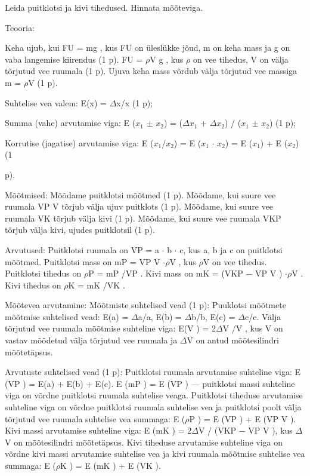 
Leida puitklotsi ja kivi tihedused. Hinnata mõõteviga.

\hint

\solu
Teooria:

Keha ujub, kui FU = mg , kus FU on üleslükke jõud, m on keha mass ja g on vaba langemise kiirendus (1 p). FU = $\rho$V g , kus $\rho$ on vee tihedus, V on välja tõrjutud vee ruumala (1 p). Ujuva keha mass võrdub välja tõrjutud vee massiga m = $\rho$V (1 p).

Suhtelise vea valem: E(x) = $\Delta$x/x (1 p);

Summa (vahe) arvutamise viga: E ($x_1$ $\pm$ $x_2$) = ($\Delta$$x_1$ + $\Delta$$x_2$) / ($x_1$ $\pm$ $x_2$) (1 p);

Korrutise (jagatise) arvutamise viga: E ($x_1$/$x_2$) = E ($x_1$ $\cdot$ $x_2$) = E ($x_1$) + E ($x_2$) (1

p).

Mõõtmised: Mõõdame puitklotsi mõõtmed (1 p). Mõõdame, kui suure vee ruumala VP V tõrjub välja ujuv puitklots (1 p). Mõõdame, kui suure vee ruumala VK tõrjub välja kivi (1 p). Mõõdame, kui suure vee ruumala VKP tõrjub välja kivi, ujudes puitklotsil (1 p).

Arvutused: Puitklotsi ruumala on VP = a $\cdot$ b $\cdot$ c, kus a, b ja c on puitklotsi mõõtmed. Puitklotsi mass on mP = VP V $\cdot\rho$V , kus $\rho$V on vee tihedus. Puitklotsi tihedus on $\rho$P = mP /VP . Kivi mass on mK = (VKP $-$ VP V ) $\cdot \rho$V . Kivi tihedus on $\rho$K = mK /VK .

Mõõtevea arvutamine: Mõõtmiste suhtelised vead (1 p): Puuklotsi mõõtmete mõõtmise suhtelised vead: E(a) = $\Delta$a/a, E(b) = $\Delta$b/b, E(c) = $\Delta$c/c. Välja tõrjutud vee ruumala mõõtmise suhteline viga: E(V ) = 2$\Delta$V /V , kus V on vastav mõõdetud välja tõrjutud vee ruumala ja $\Delta$V on antud mõõtesilindri mõõtetäpsus.

Arvutuste suhtelised vead (1 p): Puitklotsi ruumala arvutamise suhteline viga: E (VP ) = E(a) + E(b) + E(c). E (mP ) = E (VP ) --- puitklotsi massi suhteline viga on võrdne puitklotsi ruumala suhtelise veaga. Puitklotsi tiheduse arvutamise suhteline viga on võrdne puitklotsi ruumala suhtelise vea ja puitklotsi poolt välja tõrjutud vee ruumala suhtelise vea summaga: E ($\rho$P ) = E (VP ) + E (VP V ). Kivi massi arvutamise suhteline viga: E (mK ) = 2$\Delta$V / (VKP $-$ VP V ), kus $\Delta$V on mõõtesilindri mõõtetäpsus. Kivi tiheduse arvutamise suhteline viga on võrdne kivi massi arvutamise suhtelise vea ja kivi ruumala mõõtmise suhtelise vea summaga: E ($\rho$K ) = E (mK ) + E (VK ).
\probend
